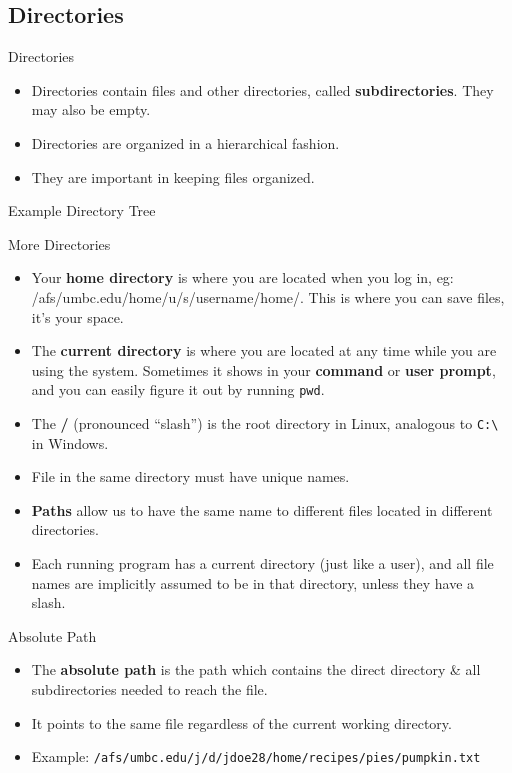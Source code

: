 \documentclass[graphics]{beamer}
\begin{document}
\subsection{Directories}
\begin{frame}{Directories}
    \begin{itemize}
        \item Directories contain files and other directories, called \textbf{subdirectories}. They may also be empty.
        \item Directories are organized in a hierarchical fashion.
        \item They are important in keeping files organized.
    \end{itemize}
\end{frame}

\begin{frame}{Example Directory Tree}
    
\end{frame}

\begin{frame}{More Directories}
    \begin{itemize}
        \item Your \textbf{home directory} is where you are located when you log in, eg: /afs/umbc.edu/home/u/s/username/home/. This is where you can save files, it's your space.
        \item The \textbf{current directory} is where you are located at any time while you are using the system. Sometimes it shows in your \textbf{command} or \textbf{user prompt}, and you can easily figure it out by running \texttt{pwd}.
        \item The \textbf{/} (pronounced ``slash'') is the root directory in Linux, analogous to \texttt{C:\textbackslash} in Windows.
        \item File in the same directory must have unique names.
        \item \textbf{Paths} allow us to have the same name to different files located in different directories.
        \item Each running program has a current directory (just like a user), and all file names are implicitly assumed to be in that directory, unless they have a slash.
    \end{itemize}
\end{frame}

\begin{frame}{Absolute Path}
    \begin{itemize}
        \item The \textbf{absolute path} is the path which contains the direct directory \& all subdirectories needed to reach the file.
        \item It points to the same file regardless of the current working directory.
        \item Example: \texttt{/afs/umbc.edu/j/d/jdoe28/home/recipes/pies/pumpkin.txt}
    \end{itemize}
\end{frame}
\end{document}
